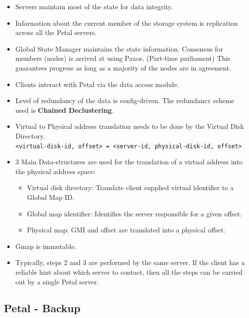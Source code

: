 \documentclass[parskip=half]{scrartcl}
\begin{document}
        \begin{itemize}
            \item
            Servers maintain most of the state for data integrity.
            \item
            Information about the current member of the storage system is replication across all the Petal servers.
            \item
            Global State Manager maintains the state information. Consensus for members (nodes) is arrived at using Paxos. (Part-time parliament) This guarantees progress as long as a majority of the nodes are in agreement.
            \item
            Clients interact with Petal via the data access module.
            \item
            Level of redundancy of the data is config-driven. The redundancy scheme used is \textbf{Chained Declustering}.
            \item
            Virtual to Physical address translation needs to be done by the Virtual Disk Directory.\\
            \texttt{<virtual-disk-id, offset> = <server-id, physical-disk-id, offset>}
            \item 
            3 Main Data-structures are used for the translation of a virtual address into the physical address space:
            \begin{itemize}
                \item 
                Virtual disk directory: Translate client supplied virtual identifier to a Global Map ID.
                \item 
                Global map identifier: Identifies the server responsible for a given offset.
                \item 
                Physical map: GMI and offset are translated into a physical offset.
            \end{itemize}
            \item 
            Gmap is immutable.
            \item 
            Typically, steps 2 and 3 are performed by the same server. If the client has a reliable hint about which server to contact, then all the steps can be carried out by a single Petal server.
        \end{itemize}


    \subsection{Petal - Backup} %
    \label{sub:petal_backup}
\end{document}
